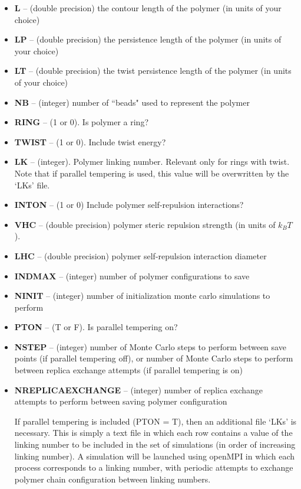 \documentclass[english]{article}
\begin{document}
\begin{itemize}
\item \textbf{L} -- (double precision) the contour length of the polymer (in units of your choice)
\item \textbf{LP} -- (double precision) the persistence length of the polymer (in units of your choice)
\item \textbf{LT} -- (double precision) the twist persistence length of the polymer (in units of your choice)
\item \textbf{NB} -- (integer) number of ``beads" used to represent the polymer 
\item \textbf{RING} -- (1 or 0). Is polymer a ring?
\item \textbf{TWIST} -- (1 or 0). Include twist energy?
\item \textbf{LK} -- (integer). Polymer linking number. Relevant only for rings with twist. Note that if parallel tempering is used, this value will be overwritten by the `LKs' file.
\item \textbf{INTON} -- (1 or 0) Include polymer self-repulsion interactions?
\item \textbf{VHC}   -- (double precision) polymer steric repulsion strength (in units of $k_BT$).
\item \textbf{LHC} -- (double precision) polymer self-repulsion interaction diameter
\item \textbf{INDMAX} -- (integer) number of polymer configurations to save
\item \textbf{NINIT} -- (integer) number of initialization monte carlo simulations to perform
\item \textbf{PTON}  -- (T or F). Is parallel tempering on?
\item \textbf{NSTEP} -- (integer) number of Monte Carlo steps to perform between save points (if parallel tempering off), or number of Monte Carlo steps to perform between replica exchange attempts (if parallel tempering is on)
\item \textbf{NREPLICAEXCHANGE} -- (integer) number of replica exchange attempts to perform between saving polymer configuration

If parallel tempering is included (PTON = T), then an additional file `LKs' is necessary. This is simply a text file in which each row contains a value of the linking number to be included in the set of simulations (in order of increasing linking number). A simulation will be launched using openMPI in which each process corresponds to a linking number, with periodic attempts to exchange polymer chain configuration between linking numbers.


\end{itemize}
\end{document}
